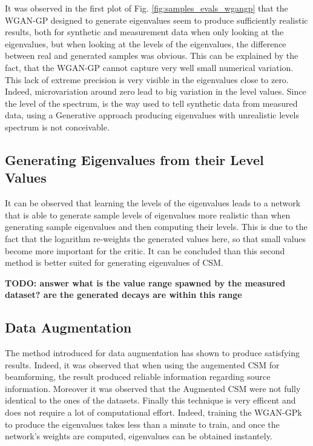 \documentclass[11pt,a4paper,twoside]{report}
\begin{document}
It was observed in the first plot of Fig. \ref{fig:samples_evals_wgangp} that the WGAN-GP designed to generate eigenvalues seem to produce sufficiently realistic results, both for synthetic and measurement data when only looking at the eigenvalues, but when looking at the levels of the eigenvalues, the difference between real and generated samples was obvious. This can be explained by the fact, that the WGAN-GP cannot capture very well small numerical variation. This lack of extreme precision is very visible in the eigenvalues close to zero. Indeed, microvariation around zero lead to big variation in the level values. Since the level of the spectrum, is the way used to tell synthetic data from measured data, using a Generative approach producing eigenvalues with unrealistic levels spectrum is not conceivable. 

\subsection{Generating Eigenvalues from their Level Values}

It can be observed that learning the levels of the eigenvalues leads to a network that is able to generate sample levels of eigenvalues more realistic than when generating sample eigenvalues and then computing their levels. This is due to the fact that the logarithm re-weights the generated values here, so that small values become more important for the critic. It can be concluded than this second method is better suited for generating eigenvalues of CSM.

\textbf{TODO: answer what is the value range spawned by the measured dataset? are the generated decays are within this range}

\subsection{Data Augmentation}

The method introduced for data augmentation has shown to produce satisfying results. Indeed, it was observed that when using the augemented CSM for beamforming, the result produced reliable information regarding source information. Moreover it was observed that the Augmented CSM were not fully identical to the ones of the datasets. Finally this technique is very efficent and does not require a lot of computational effort. Indeed, training the WGAN-GPk to produce  the eigenvalues takes less than a minute to train, and once the network's weights are computed, eigenvalues can be obtained instantely.
\end{document}
